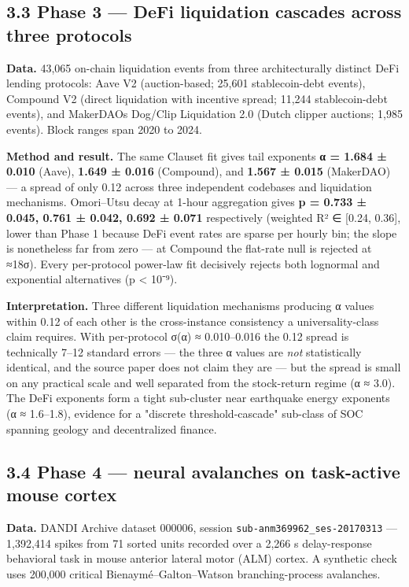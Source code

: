 \documentclass[
  11pt]{article}
\newcounter{none} %
\begin{document}
\subsection{3.3 Phase 3 --- DeFi liquidation cascades across three
protocols}\label{33-phase-3--defi-liquidation-cascades-across-three-protocols}

\textbf{Data.} 43,065 on-chain liquidation events from three
architecturally distinct DeFi lending protocols: Aave V2 (auction-based;
25,601 stablecoin-debt events), Compound V2 (direct liquidation with
incentive spread; 11,244 stablecoin-debt events), and
MakerDAO\textquotesingle s Dog/Clip Liquidation 2.0 (Dutch clipper
auctions; 1,985 events). Block ranges span 2020 to 2024.

\textbf{Method and result.} The same Clauset fit gives tail exponents
\textbf{α = 1.684 ± 0.010} (Aave), \textbf{1.649 ± 0.016} (Compound),
and \textbf{1.567 ± 0.015} (MakerDAO) --- a spread of only 0.12 across
three independent codebases and liquidation mechanisms. Omori--Utsu
decay at 1-hour aggregation gives \textbf{p = 0.733 ± 0.045, 0.761 ±
0.042, 0.692 ± 0.071} respectively (weighted R² ∈ {[}0.24, 0.36{]},
lower than Phase 1 because DeFi event rates are sparse per hourly bin;
the slope is nonetheless far from zero --- at Compound the flat-rate
null is rejected at ≈18σ). Every per-protocol power-law fit decisively
rejects both lognormal and exponential alternatives (p \textless{}
10⁻⁹).

\textbf{Interpretation.} Three different liquidation mechanisms
producing α values within 0.12 of each other is the cross-instance
consistency a universality-class claim requires. With per-protocol σ(α)
≈ 0.010--0.016 the 0.12 spread is technically 7--12 standard errors ---
the three α values are \emph{not} statistically identical, and the
source paper does not claim they are --- but the spread is small on any
practical scale and well separated from the stock-return regime (α ≈
3.0). The DeFi exponents form a tight sub-cluster near earthquake energy
exponents (α ≈ 1.6--1.8), evidence for a "discrete threshold-cascade"
sub-class of SOC spanning geology and decentralized finance.

\subsection{3.4 Phase 4 --- neural avalanches on task-active mouse
cortex}\label{34-phase-4--neural-avalanches-on-task-active-mouse-cortex}

\textbf{Data.} DANDI Archive dataset 000006, session
\texttt{sub-anm369962\_ses-20170313} --- 1,392,414 spikes from 71 sorted
units recorded over a 2,266 s delay-response behavioral task in mouse
anterior lateral motor (ALM) cortex. A synthetic check uses 200,000
critical Bienaymé--Galton--Watson branching-process avalanches.
\end{document}
